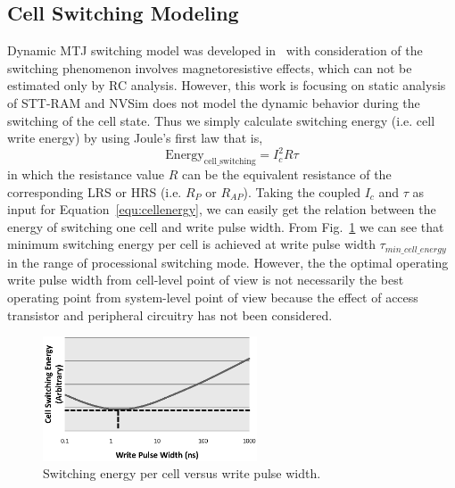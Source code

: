 \subsection{Cell Switching Modeling} \label{subsec:co-opt}
Dynamic MTJ switching model was developed in~\cite{STTRAM:Purdue10} with consideration of the switching phenomenon involves magnetoresistive effects, which can not be estimated only by RC analysis.  However, this work is focusing on static analysis of STT-RAM and NVSim does not model the dynamic behavior during the switching of the cell state. Thus we simply calculate switching energy (i.e. cell write energy) by using Joule's first law that is,
\begin{equation}
\mathrm{Energy}_{\mathrm{cell\_switching}} = I_{c}^2 R \tau \label{equ:cellenergy}
\end{equation}
in which the resistance value $R$ can be the equivalent resistance of the corresponding LRS or HRS (i.e. $R_{P}$ or $R_{AP}$). Taking the coupled $I_{c}$ and $\tau$ as input for Equation~\ref{equ:cellenergy}, we can easily get the relation between the energy of switching one cell and write pulse width. From Fig.~\ref{fig:cellenergy} we can see that minimum switching energy per cell is achieved at write pulse width $\tau_{min\_cell\_energy}$ in the range of processional switching mode. However, the the optimal operating write pulse width from cell-level point of view is not necessarily the best operating point from system-level point of view because the effect of access transistor and peripheral circuitry has not been considered.
\begin{figure}[t]
  \centering
  \includegraphics[width=2.5in]{fig/cellenergy.eps}
  \vspace{-10pt}
  \caption{Switching energy per cell versus write pulse width.}
  \label{fig:cellenergy}
\end{figure}

